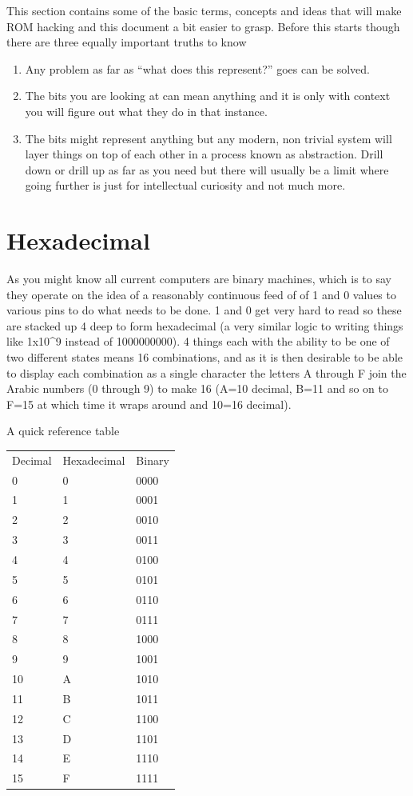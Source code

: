 \documentclass[
]{book}
\providecommand{\tightlist}{%
  \setlength{\itemsep}{0pt}\setlength{\parskip}{0pt}}
\begin{document}
This section contains some of the basic terms, concepts and ideas that will make ROM hacking and this document a bit easier to grasp. Before this starts though there are three equally important truths to know

\begin{enumerate}
\def\labelenumi{\arabic{enumi}.}
\tightlist
\item
  Any problem as far as ``what does this represent?'' goes can be solved.
\item
  The bits you are looking at can mean anything and it is only with context you will figure out what they do in that instance.
\item
  The bits might represent anything but any modern, non trivial system will layer things on top of each other in a process known as abstraction. Drill down or drill up as far as you need but there will usually be a limit where going further is just for intellectual curiosity and not much more.
\end{enumerate}

\hypertarget{hexadecimal}{%
\section{Hexadecimal}\label{hexadecimal}}

As you might know all current computers are binary machines, which is to say they operate on the idea of a reasonably continuous feed of of 1 and 0 values to various pins to do what needs to be done. 1 and 0 get very hard to read so these are stacked up 4 deep to form hexadecimal (a very similar logic to writing things like 1x10\^{}9 instead of 1000000000). 4 things each with the ability to be one of two different states means 16 combinations, and as it is then desirable to be able to display each combination as a single character the letters A through F join the Arabic numbers (0 through 9) to make 16 (A=10 decimal, B=11 and so on to F=15 at which time it wraps around and 10=16 decimal).

A quick reference table

\begin{longtable}[]{@{}lll@{}}
\toprule()
\endhead
Decimal & Hexadecimal & Binary \\
0 & 0 & 0000 \\
1 & 1 & 0001 \\
2 & 2 & 0010 \\
3 & 3 & 0011 \\
4 & 4 & 0100 \\
5 & 5 & 0101 \\
6 & 6 & 0110 \\
7 & 7 & 0111 \\
8 & 8 & 1000 \\
9 & 9 & 1001 \\
10 & A & 1010 \\
11 & B & 1011 \\
12 & C & 1100 \\
13 & D & 1101 \\
14 & E & 1110 \\
15 & F & 1111 \\
\bottomrule()
\end{longtable}
\end{document}
